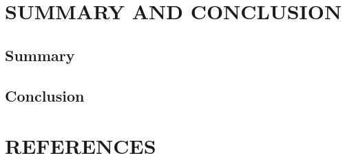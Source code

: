\documentclass[11pt]{report}
\begin{document}
	
	\chapter{SUMMARY AND CONCLUSION}
	\section{Summary}
	
	
	\section{Conclusion}
	
	

	
	\chapter*{REFERENCES}
	
	\begin{description}
		\item 
	\end{description}
	
\end{document}

